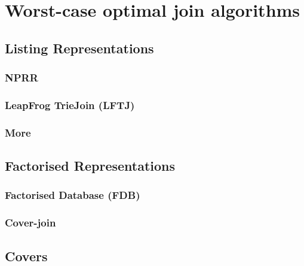 \chapter{Worst-case optimal join algorithms}

\section{Listing Representations}

\subsection{NPRR}
\subsection{LeapFrog TrieJoin (LFTJ)}
\subsection{More}

\section{Factorised Representations}

\subsection{Factorised Database (FDB)}
\subsection{Cover-join}

\section{Covers}

